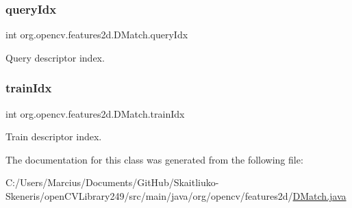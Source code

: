 \subsubsection{\texorpdfstring{query\+Idx}{queryIdx}}
{\footnotesize\ttfamily int org.\+opencv.\+features2d.\+D\+Match.\+query\+Idx}

Query descriptor index. \mbox{\label{classorg_1_1opencv_1_1features2d_1_1_d_match_a2fdbcba3ca1e7a7b0cb0eea023999a55}} 
\subsubsection{\texorpdfstring{train\+Idx}{trainIdx}}
{\footnotesize\ttfamily int org.\+opencv.\+features2d.\+D\+Match.\+train\+Idx}

Train descriptor index. 

The documentation for this class was generated from the following file\+:\begin{DoxyCompactItemize}
\item 
C\+:/\+Users/\+Marcius/\+Documents/\+Git\+Hub/\+Skaitliuko-\/\+Skeneris/open\+C\+V\+Library249/src/main/java/org/opencv/features2d/\mbox{\hyperlink{_d_match_8java}{D\+Match.\+java}}\end{DoxyCompactItemize}

